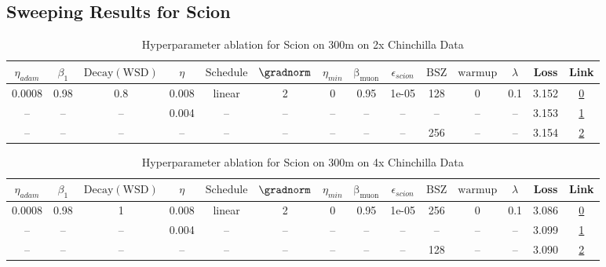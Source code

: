 \subsection{Sweeping Results for Scion}%
\begin{table}[H]
\centering
\caption{Hyperparameter ablation for Scion on 300m on 2x Chinchilla Data}
\label{tab:ablation_scion_300m_on_2x_chinchilla_data}
\begin{tabular}{cccccccccccccc}
\toprule
$\eta_{adam}$ & $\beta_1$ & $\mathrm{Decay (WSD)}$ & $\eta$ & $\mathrm{Schedule}$ & $\gradnorm$ & $\eta_{min}$ & $\mathrm{\beta_{muon}}$ & $\epsilon_{scion}$ & $\mathrm{BSZ}$ & $\mathrm{warmup}$ & $\lambda$ & Loss & Link \\
\midrule
0.0008 & 0.98 & 0.8 & 0.008 & linear & 2 & 0 & 0.95 & 1e-05 & 128 & 0 & 0.1 & 3.152 & \href{https://wandb.ai/stanford-mercury/optimizer-scaling/runs/sweep-300m-12B-scion4b55fclr0.008-wd0.1-minlr0-warmup0-b10.98-gn-2aec1d}{0} \\
\midrule
-- & -- & -- & 0.004 & -- & -- & -- & -- & -- & -- & -- & -- & 3.153 & \href{https://wandb.ai/stanford-mercury/optimizer-scaling/runs/sweep-300m-12B-scionac146alr0.004-wd0.1-minlr0-warmup0-b10.98-gn-3fb1ff}{1} \\
-- & -- & -- & -- & -- & -- & -- & -- & -- & 256 & -- & -- & 3.154 & \href{https://wandb.ai/stanford-mercury/optimizer-scaling/runs/sweep-300m-12B-scion26da5flr0.008-wd0.1-minlr0-warmup0-b10.98-gn-81fece}{2} \\
\bottomrule
\end{tabular}
\end{table}

\begin{table}[H]
\centering
\caption{Hyperparameter ablation for Scion on 300m on 4x Chinchilla Data}
\label{tab:ablation_scion_300m_on_4x_chinchilla_data}
\begin{tabular}{cccccccccccccc}
\toprule
$\eta_{adam}$ & $\beta_1$ & $\mathrm{Decay (WSD)}$ & $\eta$ & $\mathrm{Schedule}$ & $\gradnorm$ & $\eta_{min}$ & $\mathrm{\beta_{muon}}$ & $\epsilon_{scion}$ & $\mathrm{BSZ}$ & $\mathrm{warmup}$ & $\lambda$ & Loss & Link \\
\midrule
0.0008 & 0.98 & 1 & 0.008 & linear & 2 & 0 & 0.95 & 1e-05 & 256 & 0 & 0.1 & 3.086 & \href{https://wandb.ai/stanford-mercury/optimizer-scaling/runs/sweep-300m-24B-scion5f20d1lr0.008-wd0.1-minlr0-warmup0-b10.98-gn-d1d7e4}{0} \\
\midrule
-- & -- & -- & 0.004 & -- & -- & -- & -- & -- & -- & -- & -- & 3.099 & \href{https://wandb.ai/stanford-mercury/optimizer-scaling/runs/sweep-300m-24B-scion5f85f9lr0.004-wd0.1-minlr0-warmup0-b10.98-gn-af9727}{1} \\
-- & -- & -- & -- & -- & -- & -- & -- & -- & 128 & -- & -- & 3.090 & \href{https://wandb.ai/stanford-mercury/optimizer-scaling/runs/sweep-300m-24B-scion488717lr0.008-wd0.1-minlr0-warmup0-b10.98-gn-f0adfa}{2} \\
\bottomrule
\end{tabular}
\end{table}

